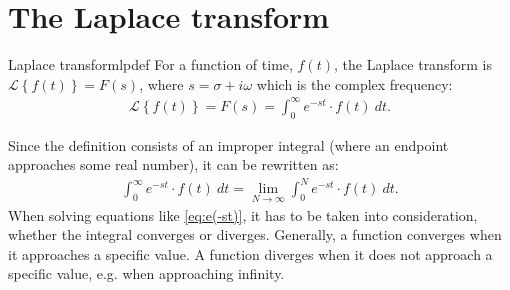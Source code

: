 \section{The Laplace transform}
\begin{definition}{Laplace transform}{lpdef}
For a function of time, $f(t)$, the Laplace transform is $\mathcal{L}\left\{ f(t)\right\} = F(s)$, where $s = \sigma + i\omega$ which is the complex frequency:
\begin{align}
\mathcal{L} \left\{f(t) \right\}=F(s)=\int_{0}^{\infty} e^{-st}\cdot f(t)\ dt.
\end{align}
\end{definition}
\noindent Since the definition consists of an improper integral (where an endpoint approaches some real number), it can be rewritten as:
\begin{align}
\int_{0}^{\infty} e^{-st}\cdot f(t)\ dt = \lim_{N \to \infty} \int_{0}^{N} e^{-st}\cdot f(t)\ dt. \label{eq:e(-st)}
\end{align}
When solving equations like \eqref{eq:e(-st)}, it has to be taken into consideration, whether the integral converges or diverges. Generally, a function converges when it approaches a specific value. A function diverges when it does not approach a specific value, e.g. when approaching infinity.

